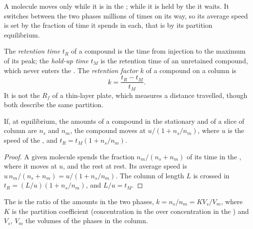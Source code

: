 A molecule moves only while it is in the ; while it is held by the  it
waits. It switches between the two phases millions of times on its way, so its average speed is set by
the fraction of time it spends in each, that is by its partition equilibrium.

\begin{definition}[Retention]\label{def:b2:chromatography:retention}
The \emph{retention time} $t_R$ of a compound is the time from injection to the
maximum of its peak; the \emph{hold-up time} $t_M$ is the retention time of an
unretained compound, which never enters the . The \emph{retention factor}
$k$ of a compound on a column is
\begin{equation*}
k = \frac{t_R - t_M}{t_M}.
\end{equation*}
It is not the $R_f$ of a thin-layer plate, which measures a distance travelled, though both describe
the same partition.
\end{definition}

\begin{proposition}\label{prop:b2:chromatography:retention-time}
If, at equilibrium, the amounts of a compound in the stationary and  of a slice of column
are $n_s$ and $n_m$, the compound moves at $u/(1 + n_s/n_m)$, where $u$ is the speed of the ,
and $t_R = t_M(1 + n_s/n_m)$.
\end{proposition}

\begin{proof}
A given molecule spends the fraction $n_m/(n_s + n_m)$ of its time in the , where it moves at
$u$, and the rest at rest. Its average speed is $u\,n_m/(n_s + n_m) = u/(1 + n_s/n_m)$. The column of
length $L$ is crossed in $t_R = (L/u)(1 + n_s/n_m)$, and $L/u = t_M$.
\end{proof}

\begin{proposition}\label{prop:b2:chromatography:k-and-K}
The  is the ratio of the amounts in the two phases, $k = n_s/n_m = KV_s/V_m$, where $K$
is the partition coefficient (concentration in the  over concentration in the ) and $V_s$, $V_m$ the volumes of the phases in the column.
\end{proposition}

